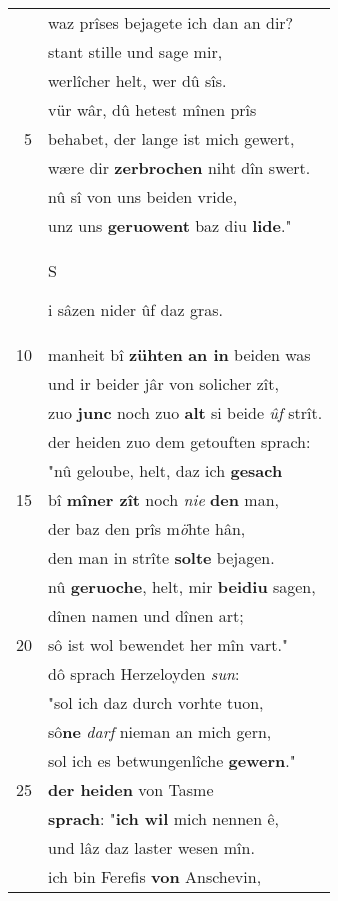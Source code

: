 \documentclass[8pt,a4paper,notitlepage]{article}
\begin{document}
\begin{table}[ht]
\begin{minipage}[t]{0.5\linewidth}
\begin{center}
\end{center}
\begin{tabular}{rl}
 & waz prîses bejagete ich dan an dir?\\ 
 & stant stille und sage mir,\\ 
 & werlîcher helt, wer dû sîs.\\ 
 & vür wâr, dû hetest mînen prîs\\ 
5 & behabet, der lange ist mich gewert,\\ 
 & wære dir \textbf{zerbrochen} niht dîn swert.\\ 
 & nû sî von uns beiden vride,\\ 
 & unz uns \textbf{geruowent} baz diu \textbf{lide}."\\ 
 & \begin{large}S\end{large}i sâzen nider ûf daz gras.\\ 
10 & manheit bî \textbf{zühten} \textbf{an in} beiden was\\ 
 & und ir beider jâr von solicher zît,\\ 
 & zuo \textbf{junc} noch zuo \textbf{alt} si beide \textit{ûf} strît.\\ 
 & der heiden zuo dem getouften sprach:\\ 
 & "nû geloube, helt, daz ich \textbf{gesach}\\ 
15 & bî \textbf{mîner zît} noch \textit{nie} \textbf{den} man,\\ 
 & der baz den prîs m\textit{ö}hte hân,\\ 
 & den man in strîte \textbf{solte} bejagen.\\ 
 & nû \textbf{geruoche}, helt, mir \textbf{beidiu} sagen,\\ 
 & dînen namen und dînen art;\\ 
20 & sô ist wol bewendet her mîn vart."\\ 
 & dô sprach Herzeloyden \textit{sun}:\\ 
 & "sol ich daz durch vorhte tuon,\\ 
 & sô\textbf{ne} \textit{darf} nieman an mich gern,\\ 
 & sol ich es betwungenlîche \textbf{gewern}."\\ 
25 & \textbf{der heiden} von Tasme\\ 
 & \textbf{sprach}: "\textbf{ich wil} mich nennen ê,\\ 
 & und lâz daz laster wesen mîn.\\ 
 & ich bin Ferefis \textbf{von} Anschevin,\\ 

\end{tabular}
\end{minipage}
\end{table}
\end{document}
